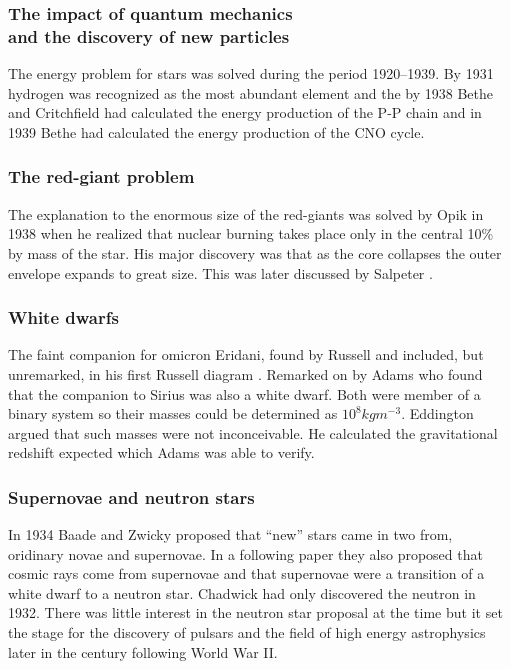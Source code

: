 \subsubsection{The impact of quantum mechanics\\ and the discovery of new particles}

The energy problem for stars was solved during the period
1920--1939. By 1931  hydrogen was recognized as the
most abundant element and the by 1938 Bethe and
Critchfield \cite{Bethe1938} had calculated the energy production of
the P-P chain and in 1939 Bethe had calculated the energy production
of the CNO cycle.

\subsubsection{The red-giant problem}

The explanation  to the enormous size of the
red-giants was solved by Opik in 1938 \cite{Opik1938} when he realized
that nuclear burning takes place only in the central 10\% by mass of
the star. His major discovery was that as the core collapses the outer
envelope expands to great size.  This was later discussed by
Salpeter \cite{Salpeter1952}.

\subsubsection{White dwarfs}

The faint companion for omicron Eridani, found by
Russell  and included, but unremarked, in his first
Russell diagram \cite{Russell1914a, Russell1914b}.  Remarked on by
Adams \cite{Adams1914, Adams1915} who found that the companion to
Sirius was also a white dwarf.  Both were member of a binary system so
their masses could be determined as $10^8 kg m^{-3}$.
Eddington \cite{Eddington1924} argued that such masses were not
inconceivable. He calculated the gravitational redshift expected which
Adams \cite{Adams1925} was able to verify.


\subsubsection{Supernovae and neutron stars}

In 1934  Baade and Zwicky \cite{Baade1934} proposed
that ``new'' stars came in two from, oridinary novae and supernovae.
In a following paper \cite{Baade1934a} they also proposed that cosmic
rays come from supernovae and that supernovae were a transition of a
white dwarf to a neutron star.  Chadwick had only discovered the neutron
in 1932.  There was little interest in the neutron star proposal at the
time but it set the stage for the discovery of pulsars and the field of
high energy astrophysics later in the century following World War II.
